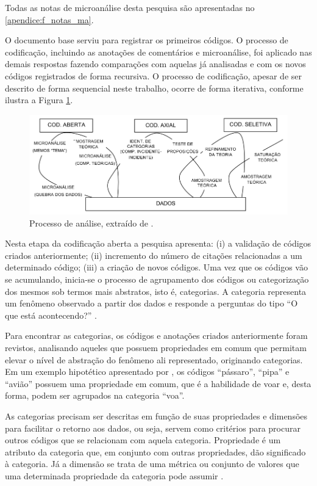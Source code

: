 Todas as notas de microanálise desta pesquisa são apresentadas no \autoref{apendice:f_notas_ma}.

O documento base serviu para registrar os primeiros códigos. O processo de codificação, incluindo as anotações de comentários e microanálise, foi aplicado nas demais respostas fazendo comparações com aquelas já analisadas e com os novos códigos registrados de forma recursiva. O processo de codificação, apesar de ser descrito de forma sequencial neste trabalho, ocorre de forma iterativa, conforme ilustra a Figura \ref{figura:gt_iterativo}.

\begin{figure}[h]
\centering %
\includegraphics[width=15cm]{figuras/gt_iterativo.png}
\caption{Processo de análise, extraído de .}
\label{figura:gt_iterativo}
\end{figure}

Nesta etapa da codificação aberta a pesquisa apresenta: (i) a validação de códigos criados anteriormente; (ii) incremento do número de citações relacionadas a um determinado código; (iii) a criação de novos códigos. Uma vez que os códigos vão se acumulando, inicia-se o processo de agrupamento dos códigos ou categorização dos mesmos sob termos mais abstratos, isto é, categorias. A categoria representa um fenômeno observado a partir dos dados e responde a perguntas do tipo ``O que está acontecendo?'' \cite{corbin:98}.

Para encontrar as categorias, os códigos e anotações criados anteriormente foram revistos, analisando aqueles que possuem propriedades em comum que permitam elevar o nível de abstração do fenômeno ali representado, originando categorias. Em um exemplo hipotético apresentado por , os códigos “pássaro”, “pipa” e “avião” possuem uma propriedade em comum, que é a habilidade de voar e, desta forma, podem ser agrupados na categoria “voa”.

As categorias precisam ser descritas em função de suas propriedades e dimensões para facilitar o retorno aos dados, ou seja, servem como critérios para procurar outros códigos que se relacionam com aquela categoria. Propriedade é um atributo da categoria que, em conjunto com outras propriedades, dão significado à categoria. Já a dimensão se trata de uma métrica ou conjunto de valores que uma determinada propriedade da categoria pode assumir \cite{strauss:87}.

